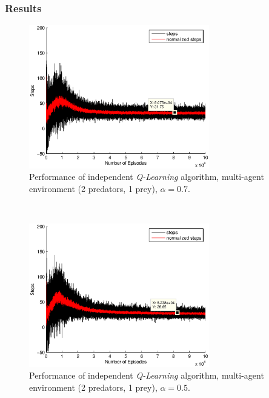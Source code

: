 \documentclass[a4paper,11pt]{article}
\begin{document}
\newpage

\subsubsection{Results}

\begin{figure}[ht!]
  \centering
    \includegraphics[width=0.7\textwidth]{figures/q207.eps}
    \caption{Performance of independent \textit{Q-Learning} algorithm, multi-agent environment (2 predators, 1 prey), $\alpha = 0.7$.}
    \label{q21}
\end{figure}
~
\begin{figure}[ht!]
  \centering
	\includegraphics[width=0.7\textwidth]{figures/q205.eps}
   \caption{Performance of independent \textit{Q-Learning} algorithm, multi-agent environment (2 predators, 1 prey), $\alpha = 0.5$.}
    \label{q22}
\end{figure}
~
\end{document}
